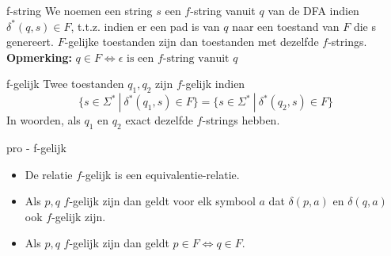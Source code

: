 
\begin{theo}[$f$-string]{f-string}
    We noemen een string $s$ een $f$-string vanuit $q$ van de DFA indien \(\delta^*(q,s) \in F\), t$.$t$.$z$.$ indien er een pad is van $q$ naar een toestand van $F$ die s genereert. $F$-gelijke toestanden
    zijn dan toestanden met dezelfde $f$-strings. \vspace{0.3cm}\\
    \textbf{Opmerking:} \(q \in F \Leftrightarrow \epsilon \text{ is een $f$-string vanuit $q$}\)
\end{theo}

\begin{theo}[$f$-gelijk]{f-gelijk}
    Twee toestanden \(q_1,q_2\) zijn $f$-gelijk indien
    \begin{equation*}
        \{ s \in \Sigma^* \ | \ \delta^*(q_1,s) \in F\} = \{s \in \Sigma^* \ | \ \delta^*(q_2,s) \in F\}
    \end{equation*}
    In woorden, als $q_1$ en $q_2$ exact dezelfde $f$-strings hebben.
\end{theo}

\begin{pro}[$f$-gelijk]{pro - f-gelijk}
    \begin{itemize}
        \item De relatie $f$-gelijk is een equivalentie-relatie.
        \item Als $p,q$ $f$-gelijk zijn dan geldt voor elk symbool $a$ dat \(\delta(p,a)\) en \(\delta(q,a)\) ook $f$-gelijk zijn.
        \item Als $p,q$ $f$-gelijk zijn dan geldt \(p \in F \Leftrightarrow q \in F\).
    \end{itemize}
\end{pro}

